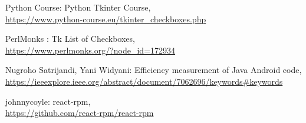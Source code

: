 \documentclass[a4paper,12pt,twoside]{memoir}
\begin{document}
\begin{thebibliography}{8}
Python Course: Python Tkinter Course,
\\\url{https://www.python-course.eu/tkinter_checkboxes.php}

PerlMonks : Tk List of Checkboxes,
\\\url{https://www.perlmonks.org/?node_id=172934}

Nugroho Satrijandi, Yani Widyani: Efficiency measurement of Java Android code,
\\\url{https://ieeexplore.ieee.org/abstract/document/7062696/keywords#keywords}

johnnycoyle: react-rpm,
\\\url{https://github.com/react-rpm/react-rpm}


\end{thebibliography}
\end{document}
